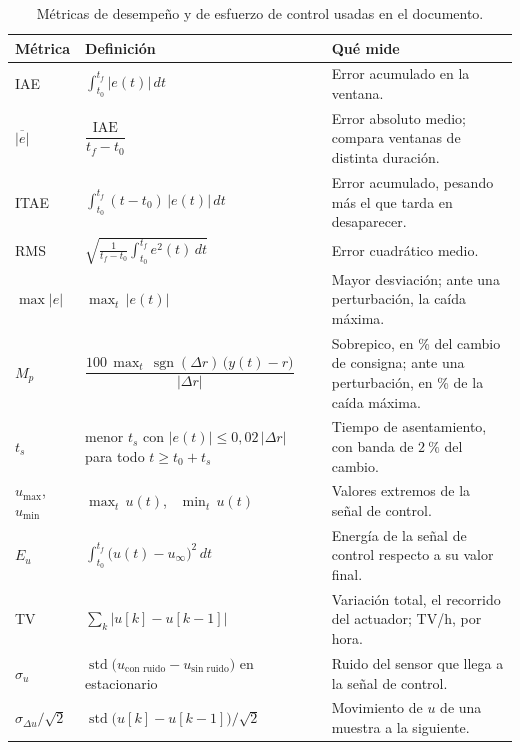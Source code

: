 \begin{table}[H]
\centering
\caption{Métricas de desempeño y de esfuerzo de control usadas en el documento.}
\label{tab:metricas}
\small
\renewcommand{\arraystretch}{1.15}
\begin{tabular}{@{}l>{\centering\arraybackslash}p{6.0cm}>{\raggedright\arraybackslash}p{7.0cm}@{}}
\toprule
\textbf{Métrica} & \textbf{Definición} & \textbf{Qué mide} \\
\midrule
IAE & $\displaystyle\int_{t_0}^{t_f} |e(t)|\,dt$ & Error acumulado en la ventana. \\
$\overline{|e|}$ & $\dfrac{\mathrm{IAE}}{t_f - t_0}$ & Error absoluto medio; compara ventanas de distinta duración. \\
ITAE & $\displaystyle\int_{t_0}^{t_f} (t - t_0)\,|e(t)|\,dt$ & Error acumulado, pesando más el que tarda en desaparecer. \\
RMS & $\displaystyle\sqrt{\frac{1}{t_f - t_0}\int_{t_0}^{t_f} e^2(t)\,dt}$ & Error cuadrático medio. \\
$\max|e|$ & $\max_t\,|e(t)|$ & Mayor desviación; ante una perturbación, la caída máxima. \\
$M_p$ & $\dfrac{100\,\max_t\,\operatorname{sgn}(\Delta r)\,\bigl(y(t) - r\bigr)}{|\Delta r|}$ & Sobrepico, en \% del cambio de consigna; ante una perturbación, en \% de la caída máxima. \\
$t_s$ & menor $t_s$ con $|e(t)| \le 0{,}02\,|\Delta r|$ para todo $t \ge t_0 + t_s$ & Tiempo de asentamiento, con banda de $2~\%$ del cambio. \\
\midrule
$u_{\max}$, $u_{\min}$ & $\max_t\,u(t)$, \ $\min_t\,u(t)$ & Valores extremos de la señal de control. \\
$E_u$ & $\displaystyle\int_{t_0}^{t_f} \bigl(u(t) - u_\infty\bigr)^2\,dt$ & Energía de la señal de control respecto a su valor final. \\
TV & $\displaystyle\sum_k \bigl|u[k] - u[k-1]\bigr|$ & Variación total, el recorrido del actuador; TV/h, por hora. \\
$\sigma_u$ & $\operatorname{std}\bigl(u_{\text{con ruido}} - u_{\text{sin ruido}}\bigr)$ en estacionario & Ruido del sensor que llega a la señal de control. \\
$\sigma_{\Delta u}/\sqrt{2}$ & $\operatorname{std}\bigl(u[k] - u[k-1]\bigr)/\sqrt{2}$ & Movimiento de $u$ de una muestra a la siguiente. \\
\bottomrule
\end{tabular}
\end{table}

